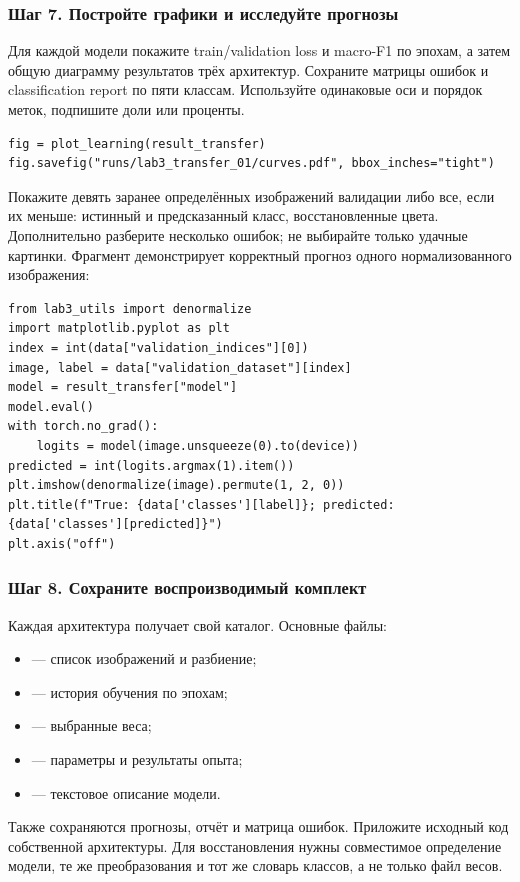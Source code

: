 \subsubsection*{Шаг 7. Постройте графики и исследуйте прогнозы}
Для каждой модели покажите train/validation loss и macro-F1 по эпохам, а затем общую диаграмму результатов трёх архитектур. Сохраните матрицы ошибок и classification report по пяти классам. Используйте одинаковые оси и порядок меток, подпишите доли или проценты.
\begin{lstlisting}
fig = plot_learning(result_transfer)
fig.savefig("runs/lab3_transfer_01/curves.pdf", bbox_inches="tight")
\end{lstlisting}

Покажите девять заранее определённых изображений валидации либо все, если их меньше: истинный и предсказанный класс, восстановленные цвета. Дополнительно разберите несколько ошибок; не выбирайте только удачные картинки. Фрагмент демонстрирует корректный прогноз одного нормализованного изображения:
\begin{lstlisting}
from lab3_utils import denormalize
import matplotlib.pyplot as plt
index = int(data["validation_indices"][0])
image, label = data["validation_dataset"][index]
model = result_transfer["model"]
model.eval()
with torch.no_grad():
    logits = model(image.unsqueeze(0).to(device))
predicted = int(logits.argmax(1).item())
plt.imshow(denormalize(image).permute(1, 2, 0))
plt.title(f"True: {data['classes'][label]}; predicted: {data['classes'][predicted]}")
plt.axis("off")
\end{lstlisting}

\subsubsection*{Шаг 8. Сохраните воспроизводимый комплект}
Каждая архитектура получает свой каталог. Основные файлы:
\begin{itemize}
\item {} --- список изображений и разбиение;
\item {} --- история обучения по эпохам;
\item {} --- выбранные веса;
\item {} --- параметры и результаты опыта;
\item {} --- текстовое описание модели.
\end{itemize}
Также сохраняются прогнозы, отчёт и матрица ошибок. Приложите исходный код собственной архитектуры. Для восстановления нужны совместимое определение модели, те же преобразования и тот же словарь классов, а не только файл весов.

